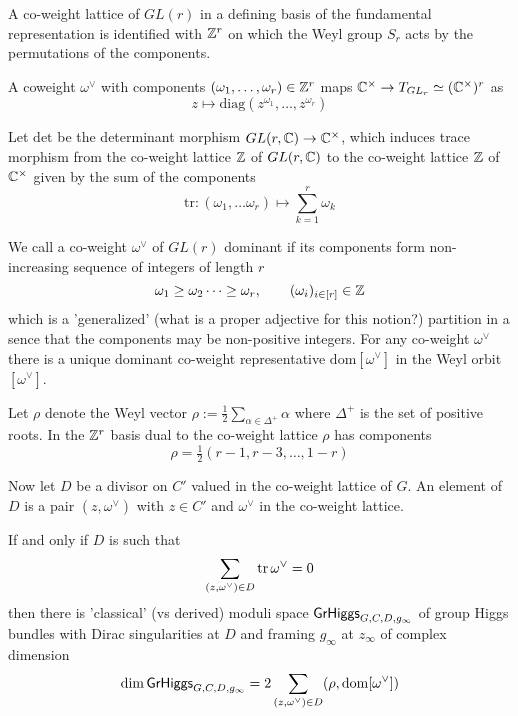 \documentclass[12pt,psamsfonts,reqno]{amsart}
\begin{document}
A co-weight lattice of $GL(r)$ in a defining basis of the fundamental representation
is identified with $\mathbb Z^{r}$ on which the Weyl group $S_r$ acts by the permutations of the components. 


A coweight $\omega^{\vee}$ with components $(\omega_1, \dots, \omega_r) \in \mathbb Z^{r}$ maps $\mathbb C^{\times} \to T_{GL_r} \simeq (\mathbb C^{\times})^{r}$ as
\begin{equation}
\label{eq:diag}
  z \mapsto \mathrm{diag}(z^{\omega_1}, \dots, z^{\omega_r})
\end{equation}

Let $\mathrm{det}$ be the determinant morphism $GL(r,\mathbb C) \to \mathbb C^{\times}$, which induces
trace morphism from the co-weight lattice $\mathbb Z$ of $GL(r,\mathbb C)$ to the co-weight lattice $\mathbb Z$ of $\mathbb C^{\times}$ given by the sum
of the components 
\begin{equation}
\mathrm{tr}:   (\omega_1, \dots \omega_r) \mapsto \sum_{k=1}^{r} \omega_k 
\end{equation}

We call a co-weight $\omega^{\vee}$ of $GL(r)$ dominant if its components form non-increasing sequence of integers of length $r$
\begin{equation}
\label{eq:GLcoweight}
  \omega_1 \geq \omega_2 \dots \geq \omega_r, \qquad (\omega_i)_{i \in [r]} \in \mathbb Z
\end{equation}
which is a 'generalized' (what is a proper adjective for this notion?) partition in a sence that the components may be non-positive integers. For any co-weight $\omega^{\vee}$ there is a unique dominant co-weight representative $\mathrm{dom} [\omega^{\vee}]$
in the Weyl orbit $[\omega^{\vee}]$.

Let $\rho$ denote the Weyl vector $\rho := \frac{1}{2} \sum_{\alpha \in \Delta^{+}} \alpha $ where $\Delta^{+}$ is
the set of positive roots. In the $\mathbb Z^{r}$ basis dual to the co-weight lattice $\rho$ has components
\begin{equation}
  \rho = \tfrac{1}{2} ( r - 1, r - 3, \dots, 1-r)
\end{equation}


Now let $D$ be a divisor on $C'$ valued in the co-weight lattice of $G$. An element of $D$ is a pair $(z, \omega^\vee)$
with $z \in C'$ and $\omega^{\vee}$ in the co-weight lattice.
\begin{lemma}
  If and only if $D$ is such that 
  \begin{equation}
    \sum_{(z,\omega^{\vee}) \in D} \operatorname{tr} \omega^{\vee} = 0
  \end{equation}
  then there is 'classical' (vs derived) moduli space $\mathsf{GrHiggs}_{G,C,D,g_\infty}$
  of group Higgs bundles with Dirac singularities at $D$ and framing $g_\infty$ at $z_\infty$ of complex dimension
  \begin{equation}
\label{eq:dim}
    \dim \mathsf{GrHiggs}_{G,C,D,g_\infty} =   2  \sum_{(z,\omega^{\vee}) \in D} ( \rho, \mathrm{dom}[\omega^{\vee}])
  \end{equation}
\end{lemma}
\end{document}
